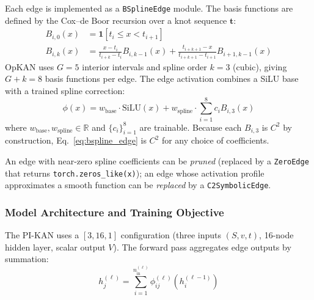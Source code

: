 \documentclass[11pt,a4paper]{article}
\begin{document}
Each edge is implemented as a \texttt{BSplineEdge} module. The basis functions are
defined by the Cox--de Boor recursion over a knot sequence $\mathbf{t}$:
\begin{align}
B_{i,0}(x) &= \mathbf{1}[t_i \leq x < t_{i+1}] \\
B_{i,k}(x) &= \frac{x - t_i}{t_{i+k} - t_i} B_{i,k-1}(x)
             + \frac{t_{i+k+1} - x}{t_{i+k+1} - t_{i+1}} B_{i+1,k-1}(x)
\label{eq:cox_de_boor}
\end{align}
OpKAN uses $G=5$ interior intervals and spline order $k=3$ (cubic), giving $G+k=8$
basis functions per edge. The edge activation combines a SiLU base with a trained
spline correction:
\begin{equation}
\phi(x) = w_\text{base} \cdot \text{SiLU}(x)
         + w_\text{spline} \cdot \sum_{i=1}^{8} c_i B_{i,3}(x)
\label{eq:bspline_edge}
\end{equation}
where $w_\text{base}, w_\text{spline} \in \mathbb{R}$ and $\{c_i\}_{i=1}^8$ are
trainable. Because each $B_{i,3}$ is $C^2$ by construction, Eq.~\eqref{eq:bspline_edge}
is $C^2$ for any choice of coefficients.

An edge with near-zero spline coefficients can be \emph{pruned} (replaced by a
\texttt{ZeroEdge} that returns \texttt{torch.zeros\_like(x)}); an edge whose activation
profile approximates a smooth function can be \emph{replaced} by a
\texttt{C2SymbolicEdge}.

\subsubsection{Model Architecture and Training Objective}

The PI-KAN uses a $[3, 16, 1]$ configuration (three inputs $(S,v,t)$, 16-node hidden
layer, scalar output $V$). The forward pass aggregates edge outputs by summation:
\begin{equation}
h_j^{(\ell)} = \sum_{i=1}^{n_\text{in}^{(\ell)}} \phi_{ij}^{(\ell)}\!\left(h_i^{(\ell-1)}\right)
\label{eq:kan_forward}
\end{equation}
\end{document}
